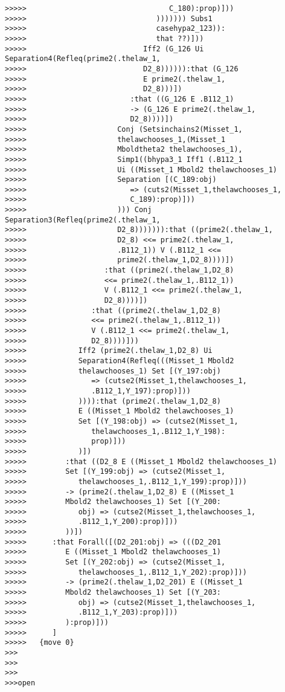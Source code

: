 \documentclass[12pt]{article}
\begin{document}
\begin{verbatim}
>>>>>                                 C_180):prop)]))
>>>>>                              ))))))) Subs1
>>>>>                              casehypa2_123)):
>>>>>                              that ??)]))
>>>>>                           Iff2 (G_126 Ui Separation4(Refleq(prime2(.thelaw_1,
>>>>>                           D2_8)))))):that (G_126
>>>>>                           E prime2(.thelaw_1,
>>>>>                           D2_8)))])
>>>>>                        :that ((G_126 E .B112_1)
>>>>>                        -> (G_126 E prime2(.thelaw_1,
>>>>>                        D2_8))))])
>>>>>                     Conj (Setsinchains2(Misset_1,
>>>>>                     thelawchooses_1,(Misset_1
>>>>>                     Mboldtheta2 thelawchooses_1),
>>>>>                     Simp1((bhypa3_1 Iff1 (.B112_1
>>>>>                     Ui ((Misset_1 Mbold2 thelawchooses_1)
>>>>>                     Separation [(C_189:obj)
>>>>>                        => (cuts2(Misset_1,thelawchooses_1,
>>>>>                        C_189):prop)]))
>>>>>                     ))) Conj Separation3(Refleq(prime2(.thelaw_1,
>>>>>                     D2_8))))))):that ((prime2(.thelaw_1,
>>>>>                     D2_8) <<= prime2(.thelaw_1,
>>>>>                     .B112_1)) V (.B112_1 <<=
>>>>>                     prime2(.thelaw_1,D2_8))))])
>>>>>                  :that ((prime2(.thelaw_1,D2_8)
>>>>>                  <<= prime2(.thelaw_1,.B112_1))
>>>>>                  V (.B112_1 <<= prime2(.thelaw_1,
>>>>>                  D2_8))))])
>>>>>               :that ((prime2(.thelaw_1,D2_8)
>>>>>               <<= prime2(.thelaw_1,.B112_1))
>>>>>               V (.B112_1 <<= prime2(.thelaw_1,
>>>>>               D2_8))))]))
>>>>>            Iff2 (prime2(.thelaw_1,D2_8) Ui
>>>>>            Separation4(Refleq(((Misset_1 Mbold2
>>>>>            thelawchooses_1) Set [(Y_197:obj)
>>>>>               => (cutse2(Misset_1,thelawchooses_1,
>>>>>               .B112_1,Y_197):prop)]))
>>>>>            )))):that (prime2(.thelaw_1,D2_8)
>>>>>            E ((Misset_1 Mbold2 thelawchooses_1)
>>>>>            Set [(Y_198:obj) => (cutse2(Misset_1,
>>>>>               thelawchooses_1,.B112_1,Y_198):
>>>>>               prop)]))
>>>>>            )])
>>>>>         :that ((D2_8 E ((Misset_1 Mbold2 thelawchooses_1)
>>>>>         Set [(Y_199:obj) => (cutse2(Misset_1,
>>>>>            thelawchooses_1,.B112_1,Y_199):prop)]))
>>>>>         -> (prime2(.thelaw_1,D2_8) E ((Misset_1
>>>>>         Mbold2 thelawchooses_1) Set [(Y_200:
>>>>>            obj) => (cutse2(Misset_1,thelawchooses_1,
>>>>>            .B112_1,Y_200):prop)]))
>>>>>         ))])
>>>>>      :that Forall([(D2_201:obj) => (((D2_201
>>>>>         E ((Misset_1 Mbold2 thelawchooses_1)
>>>>>         Set [(Y_202:obj) => (cutse2(Misset_1,
>>>>>            thelawchooses_1,.B112_1,Y_202):prop)]))
>>>>>         -> (prime2(.thelaw_1,D2_201) E ((Misset_1
>>>>>         Mbold2 thelawchooses_1) Set [(Y_203:
>>>>>            obj) => (cutse2(Misset_1,thelawchooses_1,
>>>>>            .B112_1,Y_203):prop)]))
>>>>>         ):prop)]))
>>>>>      ]
>>>>>   {move 0}
>>>
>>>
>>>
>>>open


\end{verbatim}
\end{document}
